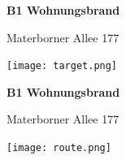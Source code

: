 \documentclass[parskip=half,12pt,DIV=15]{scrartcl}
\begin{document}

\begin{minipage}[t]{.75\textwidth}
\Huge
\textbf{B1 Wohnungsbrand}

Materborner Allee 177
\end{minipage}
\hfill
\begin{minipage}[t]{.15\textwidth}
    \hfill
\end{minipage}

\texttt{[image: target.png]}

\newpage

\begin{minipage}[t]{.75\textwidth}
\Huge
\textbf{B1 Wohnungsbrand}

Materborner Allee 177
\end{minipage}
\hfill
\begin{minipage}[t]{.15\textwidth}
    \hfill
\end{minipage}

\texttt{[image: route.png]}

\end{document}
